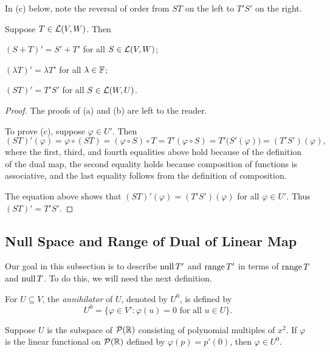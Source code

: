In (c) below, note the reversal of order from $ST$ on the left to $T'S'$ on the
right.

\begin{result}\label{ax:3.120}
Suppose $T\in\mathcal{L}(V,W)$. Then
\begin{parts}
\item $(S+T)'=S'+T'$ for all $S\in\mathcal{L}(V,W)$;
\item $(\lambda T)'=\lambda T'$ for all $\lambda\in\mathbb{F}$;
\item $(ST)'=T'S'$ for all $S\in\mathcal{L}(W,U)$.
\end{parts}
\end{result}

\begin{proof}
The proofs of (a) and (b) are left to the reader.

To prove (c), suppose $\varphi\in U'$. Then
\[ (ST)'(\varphi) = \varphi\circ(ST) = (\varphi\circ S)\circ T
   = T'(\varphi\circ S) = T'\bigl(S'(\varphi)\bigr) = (T'S')(\varphi), \]
%
where the first, third, and fourth equalities above hold because of the
definition of the dual map, the second equality holds because composition of
functions is associative, and the last equality follows from the definition of
composition.

The equation above shows that $(ST)'(\varphi)=(T'S')(\varphi)$ for all
$\varphi\in U'$. Thus $(ST)'=T'S'$.
\end{proof}

\subsection{Null Space and Range of Dual of Linear Map}

Our goal in this subsection is to describe $\operatorname{null} T'$ and $\operatorname{range} T'$ in terms of
$\operatorname{range} T$ and $\operatorname{null} T$. To do this, we will need the next definition.

\begin{definition}[Annihilator, $U^0$]\label{ax:3.121}
For $U\subseteq V$, the \emph{annihilator} of $U$, denoted by $U^0$, is defined
by
\[ U^0 = \{\varphi\in V' : \varphi(u)=0 \text{ for all } u\in U\}. \]
\end{definition}

\begin{example}\label{ax:3.122}
Suppose $U$ is the subspace of $\mathcal{P}(\mathbb{R})$ consisting of polynomial multiples of
$x^2$. If $\varphi$ is the linear functional on $\mathcal{P}(\mathbb{R})$ defined by
$\varphi(p)=p'(0)$, then $\varphi\in U^0$.
\end{example}

